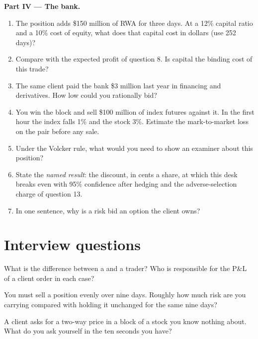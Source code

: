 \begin{problem}
\medskip\noindent\textbf{Part IV --- The bank.}
\begin{enumerate}[resume]
\item The position adds \$150 million of RWA for three days. At a 12\%
capital ratio and a 10\% cost of equity, what does that capital cost in
dollars (use 252 days)?
\item Compare with the expected profit of question 8. Is capital the
binding cost of this trade?
\item The same client paid the bank \$3 million last year in financing and
derivatives. How low could you rationally bid?
\item You win the block and sell \$100 million of index futures against it.
In the first hour the index falls 1\% and the stock 3\%. Estimate the
mark-to-market loss on the pair before any sale.
\item Under the Volcker rule, what would you need to show an examiner about
this position?
\item State the \emph{named result}: the discount, in cents a share, at
which this desk breaks even with 95\% confidence after hedging and the
adverse-selection charge of question 13.
\item In one sentence, why is a risk bid an option the client owns?
\end{enumerate}
\end{problem}

\section{Interview questions}

\begin{interviewq}\label{iq:m1:the-sell-side:1}
What is the difference between a  and a trader? Who is
responsible for the P\&L of a client order in each case?
\end{interviewq}

\begin{interviewq}\label{iq:m1:the-sell-side:2}
You must sell a position evenly over nine days. Roughly how much risk are
you carrying compared with holding it unchanged for the same nine days?
\end{interviewq}

\begin{interviewq}\label{iq:m1:the-sell-side:3}
A client asks for a two-way price in a block of a stock you know nothing
about. What do you ask yourself in the ten seconds you have?
\end{interviewq}


